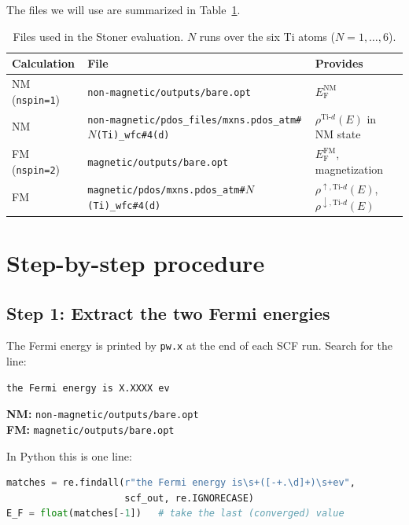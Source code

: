 \documentclass[11pt,a4paper]{article}
\newcommand{\Ef}{E_{\mathrm{F}}}
\newcommand{\Tid}{\text{Ti-}d}
\begin{document}
\noindent The files we will use are summarized in Table~\ref{tab:files}.
%
\begin{table}[h!]
\small
\centering
\begin{tabular}{l l l}
\toprule
Calculation                    & File                                                  & Provides \\
\midrule
NM (\texttt{nspin=1})          & \texttt{non-magnetic/outputs/bare.opt}                & $\Ef^{\text{NM}}$ \\
NM                             & \texttt{non-magnetic/pdos\_files/mxns.pdos\_atm\#$N$(Ti)\_wfc\#4(d)} & $\rho^{\Tid}(E)$ in NM state \\
FM (\texttt{nspin=2})          & \texttt{magnetic/outputs/bare.opt}                    & $\Ef^{\text{FM}}$, magnetization \\
FM                             & \texttt{magnetic/pdos/mxns.pdos\_atm\#$N$(Ti)\_wfc\#4(d)}            & $\rho^{\uparrow,\Tid}(E)$, $\rho^{\downarrow,\Tid}(E)$ \\
\bottomrule
\end{tabular}
\caption{Files used in the Stoner evaluation. $N$ runs over the six Ti
atoms ($N = 1,\dots,6$).}
\label{tab:files}
\end{table}

\section{Step-by-step procedure}

\subsection{Step 1: Extract the two Fermi energies}

The Fermi energy is printed by \texttt{pw.x} at the end of each SCF run.
Search for the line:
%
\begin{lstlisting}
the Fermi energy is X.XXXX ev
\end{lstlisting}

\begin{filebox}
\textbf{NM:} \texttt{non-magnetic/outputs/bare.opt}\\
\textbf{FM:} \texttt{magnetic/outputs/bare.opt}
\end{filebox}

In Python this is one line:
\begin{lstlisting}[language=Python]
matches = re.findall(r"the Fermi energy is\s+([-+.\d]+)\s+ev",
                     scf_out, re.IGNORECASE)
E_F = float(matches[-1])   # take the last (converged) value
\end{lstlisting}
\end{document}
